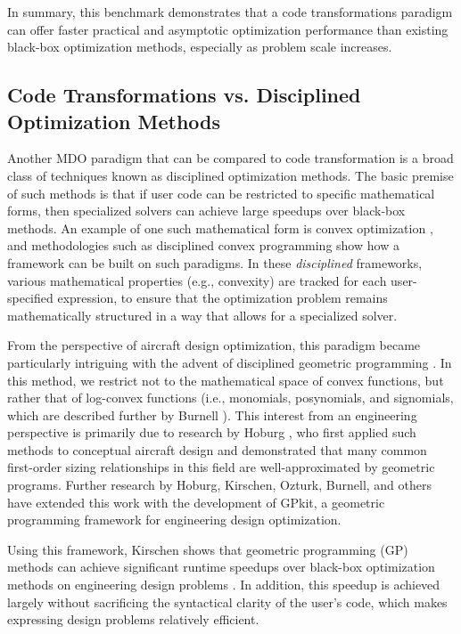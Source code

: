 In summary, this benchmark demonstrates that a code transformations paradigm can offer faster practical and asymptotic optimization performance than existing black-box optimization methods, especially as problem scale increases.

\subsection{Code Transformations vs. Disciplined Optimization Methods}
\label{sec:benchmark_gpkit}

Another MDO paradigm that can be compared to code transformation is a broad class of techniques known as disciplined optimization methods. The basic premise of such methods is that if user code can be restricted to specific mathematical forms, then specialized solvers can achieve large speedups over black-box methods. An example of one such mathematical form is convex optimization \cite{boyd_convex_2004}, and methodologies such as disciplined convex programming \cite{grant_disciplined_2006} show how a framework can be built on such paradigms. In these \emph{disciplined} frameworks, various mathematical properties (e.g., convexity) are tracked for each user-specified expression, to ensure that the optimization problem remains mathematically structured in a way that allows for a specialized solver.

From the perspective of aircraft design optimization, this paradigm became particularly intriguing with the advent of disciplined geometric programming \cite{boyd_tutorial_2007, agrawal_disciplined_2019}. In this method, we restrict not to the mathematical space of convex functions, but rather that of log-convex functions (i.e., monomials, posynomials, and signomials, which are described further by Burnell \cite{gpkit}). This interest from an engineering perspective is primarily due to research by Hoburg \cite{hoburg_geometric_2014}, who first applied such methods to conceptual aircraft design and demonstrated that many common first-order sizing relationships in this field are well-approximated by geometric programs. Further research by Hoburg, Kirschen, Ozturk, Burnell, and others \cite{kirschen, ozturk_conceptual_2018, jho} have extended this work with the development of GPkit, a geometric programming framework for engineering design optimization.

Using this framework, Kirschen shows that geometric programming (GP) methods can achieve significant runtime speedups over black-box optimization methods on engineering design problems \cite{kirschen}. In addition, this speedup is achieved largely without sacrificing the syntactical clarity of the user's code, which makes expressing design problems relatively efficient.

